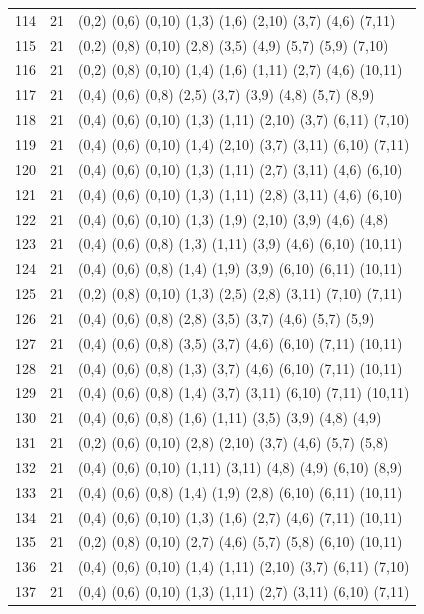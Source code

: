 {\begin{longtable}{lll}
114 & 21 & (0,2) (0,6) (0,10) (1,3) (1,6) (2,10) (3,7) (4,6) (7,11) \\
115 & 21 & (0,2) (0,8) (0,10) (2,8) (3,5) (4,9) (5,7) (5,9) (7,10) \\
116 & 21 & (0,2) (0,8) (0,10) (1,4) (1,6) (1,11) (2,7) (4,6) (10,11) \\
117 & 21 & (0,4) (0,6) (0,8) (2,5) (3,7) (3,9) (4,8) (5,7) (8,9) \\
118 & 21 & (0,4) (0,6) (0,10) (1,3) (1,11) (2,10) (3,7) (6,11) (7,10) \\
119 & 21 & (0,4) (0,6) (0,10) (1,4) (2,10) (3,7) (3,11) (6,10) (7,11) \\
120 & 21 & (0,4) (0,6) (0,10) (1,3) (1,11) (2,7) (3,11) (4,6) (6,10) \\
121 & 21 & (0,4) (0,6) (0,10) (1,3) (1,11) (2,8) (3,11) (4,6) (6,10) \\
122 & 21 & (0,4) (0,6) (0,10) (1,3) (1,9) (2,10) (3,9) (4,6) (4,8) \\
123 & 21 & (0,4) (0,6) (0,8) (1,3) (1,11) (3,9) (4,6) (6,10) (10,11) \\
124 & 21 & (0,4) (0,6) (0,8) (1,4) (1,9) (3,9) (6,10) (6,11) (10,11) \\
125 & 21 & (0,2) (0,8) (0,10) (1,3) (2,5) (2,8) (3,11) (7,10) (7,11) \\
126 & 21 & (0,4) (0,6) (0,8) (2,8) (3,5) (3,7) (4,6) (5,7) (5,9) \\
127 & 21 & (0,4) (0,6) (0,8) (3,5) (3,7) (4,6) (6,10) (7,11) (10,11) \\
128 & 21 & (0,4) (0,6) (0,8) (1,3) (3,7) (4,6) (6,10) (7,11) (10,11) \\
129 & 21 & (0,4) (0,6) (0,8) (1,4) (3,7) (3,11) (6,10) (7,11) (10,11) \\
130 & 21 & (0,4) (0,6) (0,8) (1,6) (1,11) (3,5) (3,9) (4,8) (4,9) \\
131 & 21 & (0,2) (0,6) (0,10) (2,8) (2,10) (3,7) (4,6) (5,7) (5,8) \\
132 & 21 & (0,4) (0,6) (0,10) (1,11) (3,11) (4,8) (4,9) (6,10) (8,9) \\
133 & 21 & (0,4) (0,6) (0,8) (1,4) (1,9) (2,8) (6,10) (6,11) (10,11) \\
134 & 21 & (0,4) (0,6) (0,10) (1,3) (1,6) (2,7) (4,6) (7,11) (10,11) \\
135 & 21 & (0,2) (0,8) (0,10) (2,7) (4,6) (5,7) (5,8) (6,10) (10,11) \\
136 & 21 & (0,4) (0,6) (0,10) (1,4) (1,11) (2,10) (3,7) (6,11) (7,10) \\
137 & 21 & (0,4) (0,6) (0,10) (1,3) (1,11) (2,7) (3,11) (6,10) (7,11) \\

\end{longtable}}
